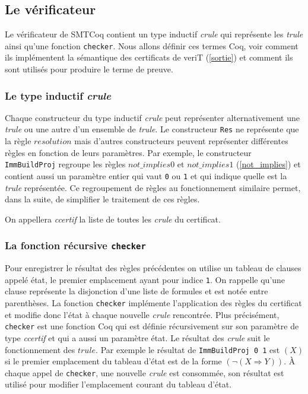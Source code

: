 \documentclass[11pt]{article}
\begin{document}
\subsection{Le vérificateur}

Le vérificateur de SMTCoq contient un type inductif \textit{crule} qui représente les \textit{trule} ainsi qu'une fonction \texttt{checker}. Nous allons définir ces termes Coq, voir comment ils implémentent la sémantique des certificats de veriT (\ref{sortie}) et comment ils sont utilisés pour produire le terme de preuve.


\subsubsection{Le type inductif \textit{crule}}\label{regroupement}


Chaque constructeur du type inductif \textit{crule} peut représenter alternativement une \textit{trule} ou une autre d'un ensemble de \textit{trule}. Le constructeur \texttt{Res} ne représente que la règle $resolution$ mais d'autres constructeurs peuvent représenter différentes règles en fonction de leurs paramètres. Par exemple, le constructeur \texttt{ImmBuildProj} regroupe les règles $not\_implies0$ et $not\_implies1$ (\ref{not_implies}) et contient aussi un paramètre entier qui vaut \texttt{0} ou \texttt{1} et qui indique quelle est la \textit{trule} représentée. Ce regroupement de règles au fonctionnement similaire permet, dans la suite, de simplifier le traitement de ces règles. \medbreak

On appellera \textit{ccertif} la liste de toutes les \textit{crule} du certificat.


\subsubsection{La fonction récursive \texttt{checker}} \label{checker}

Pour enregistrer le résultat des règles précédentes on utilise un tableau de clauses appelé état, le premier emplacement ayant pour indice \texttt{1}. On rappelle qu'une clause représente la disjonction d'une liste de formules et est notée  entre parenthèses. La fonction \texttt{checker} implémente l'application des règles du certificat et modifie donc l'état à chaque nouvelle \textit{crule} rencontrée. Plus précisément, \texttt{checker} est une fonction Coq qui est définie récursivement sur son paramètre de type \textit{ccertif} et qui a aussi un paramètre état. Le résultat des \textit{crule} suit le fonctionnement des $trule$. Par exemple le résultat de \texttt{ImmBuildProj 0 1} est $(X)$ si le premier emplacement du tableau d'état est de la forme $(\neg (X \Rightarrow Y))$. À chaque appel de \texttt{checker}, une nouvelle \textit{crule} est consommée, son résultat est utilisé pour modifier l'emplacement courant du tableau d'état.\medbreak
\end{document}
